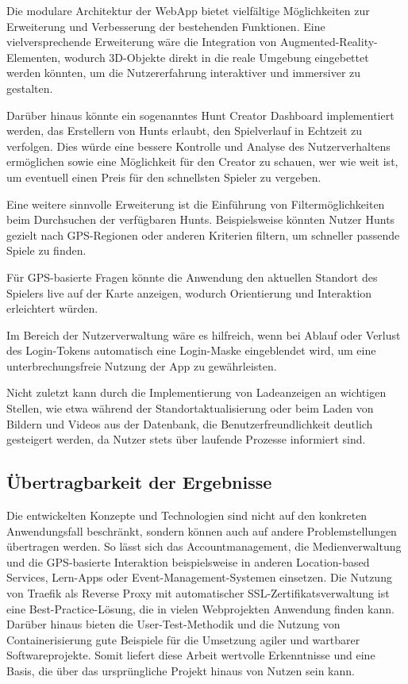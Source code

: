 \documentclass[oneside]{ausarbeitung}
\begin{document}
Die modulare Architektur der WebApp bietet vielfältige Möglichkeiten zur Erweiterung und Verbesserung der bestehenden Funktionen.  
Eine vielversprechende Erweiterung wäre die Integration von Augmented-Reality-Elementen, wodurch 3D-Objekte direkt in die reale Umgebung eingebettet werden könnten, um die Nutzererfahrung interaktiver und immersiver zu gestalten.  

Darüber hinaus könnte ein sogenanntes Hunt Creator Dashboard implementiert werden, das Erstellern von Hunts erlaubt, den Spielverlauf in Echtzeit zu verfolgen.  
Dies würde eine bessere Kontrolle und Analyse des Nutzerverhaltens ermöglichen sowie eine Möglichkeit für den Creator zu schauen, wer wie weit ist, um eventuell einen Preis für den schnellsten Spieler zu vergeben. 

Eine weitere sinnvolle Erweiterung ist die Einführung von Filtermöglichkeiten beim Durchsuchen der verfügbaren Hunts.  
Beispielsweise könnten Nutzer Hunts gezielt nach GPS-Regionen oder anderen Kriterien filtern, um schneller passende Spiele zu finden.  

Für GPS-basierte Fragen könnte die Anwendung den aktuellen Standort des Spielers live auf der Karte anzeigen, wodurch Orientierung und Interaktion erleichtert würden.  

Im Bereich der Nutzerverwaltung wäre es hilfreich, wenn bei Ablauf oder Verlust des Login-Tokens automatisch eine Login-Maske eingeblendet wird, um eine unterbrechungsfreie Nutzung der App zu gewährleisten.  

Nicht zuletzt kann durch die Implementierung von Ladeanzeigen an wichtigen Stellen, wie etwa während der Standortaktualisierung oder beim Laden von Bildern und Videos aus der Datenbank, die Benutzerfreundlichkeit deutlich gesteigert werden, da Nutzer stets über laufende Prozesse informiert sind.  

\subsection{Übertragbarkeit der Ergebnisse}
\label{sub:uebertragbarkeit}

Die entwickelten Konzepte und Technologien sind nicht auf den konkreten Anwendungsfall beschränkt, sondern können auch auf andere Problemstellungen übertragen werden.  
So lässt sich das Accountmanagement, die Medienverwaltung und die GPS-basierte Interaktion beispielsweise in anderen Location-based Services, Lern-Apps oder Event-Management-Systemen einsetzen.  
Die Nutzung von Traefik als Reverse Proxy mit automatischer SSL-Zertifikatsverwaltung ist eine Best-Practice-Lösung, die in vielen Webprojekten Anwendung finden kann.  
Darüber hinaus bieten die User-Test-Methodik und die Nutzung von Containerisierung gute Beispiele für die Umsetzung agiler und wartbarer Softwareprojekte.  
Somit liefert diese Arbeit wertvolle Erkenntnisse und eine Basis, die über das ursprüngliche Projekt hinaus von Nutzen sein kann.

\appendix

\printbibliography[heading=bibintoc]

\end{document}
